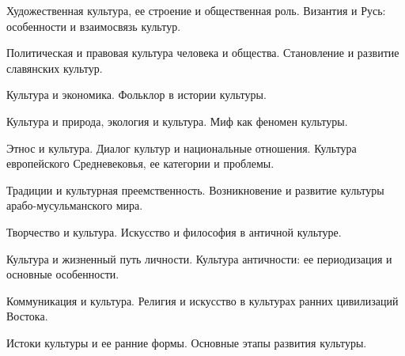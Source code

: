 \documentclass[
	14pt,
	a4paper,
	]
	{scrartcl}
\begin{document}
\vfill
\z Художественная культура, ее строение и общественная роль.
 \vfill
\z Византия и Русь: особенности и взаимосвязь культур.
 \vfill

\vfill

\newpage


\shapk
{}
\setcounter{zad}{0}

\vfill
\z Политическая и правовая культура человека и общества.
 \vfill
\z Становление и развитие славянских культур.
 \vfill

\vfill

\newpage


\shapk
{}
\setcounter{zad}{0}

\vfill
\z Культура и экономика.
 \vfill
\z Фольклор в истории культуры.
 \vfill

\vfill

\newpage


\shapk
{}
\setcounter{zad}{0}

\vfill
\z Культура и природа, экология и культура.
 \vfill
\z Миф как феномен культуры.
 \vfill

\vfill

\newpage


\shapk
{}
\setcounter{zad}{0}

\vfill
\z Этнос и культура. Диалог культур и национальные отношения.
 \vfill
\z Культура европейского Средневековья, ее категории и проблемы.
 \vfill

\vfill

\newpage


\shapk
{}
\setcounter{zad}{0}

\vfill
\z Традиции и культурная преемственность.
 \vfill
\z Возникновение и развитие культуры арабо-мусульманского мира.
 \vfill

\vfill

\newpage


\shapk
{}
\setcounter{zad}{0}

\vfill
\z Творчество и культура.
 \vfill
\z Искусство и философия в античной культуре.
 \vfill

\vfill

\newpage


\shapk
{}
\setcounter{zad}{0}

\vfill
\z Культура и жизненный путь личности.
 \vfill
\z Культура античности: ее периодизация и основные особенности.
 \vfill

\vfill

\newpage


\shapk
{}
\setcounter{zad}{0}

\vfill
\z Коммуникация и культура.
 \vfill
\z Религия и искусство в культурах ранних цивилизаций Востока.
 \vfill

\vfill

\newpage


\shapk
{}
\setcounter{zad}{0}

\vfill
\z Истоки культуры и ее ранние формы.
 \vfill
\z Основные этапы развития культуры.
 \vfill

\vfill

\newpage
\end{document}
